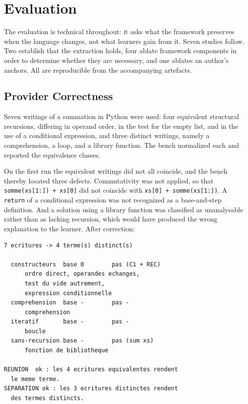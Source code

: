 \documentclass[10pt,twocolumn,letterpaper]{article}
\begin{document}
\section{Evaluation}
The evaluation is technical throughout: it asks what the framework
preserves when the language changes, not what learners gain from it.
Seven studies follow. Two establish that the extraction holds, four ablate
framework components in order to determine whether they are necessary, and
one ablates an author's anchors.
All are reproducible from the accompanying artefacts.

\subsection{Provider Correctness}
Seven writings of a summation in Python were used: four equivalent
structural recursions, differing in operand order, in the test for the
empty list, and in the use of a conditional expression, and three
distinct writings, namely a comprehension, a loop, and a library
function. The bench normalized each and reported the equivalence
classes.

On the first run the equivalent writings did not all coincide, and the
bench thereby located three defects. Commutativity was not applied, so that
\texttt{somme(xs[1:]) + xs[0]} did not coincide with
\texttt{xs[0] + somme(xs[1:])}. A \texttt{return} of a
conditional expression was not recognized as a base-and-step definition.
And a solution using a library function was classified as unanalysable
rather than as lacking recursion, which would have produced the wrong
explanation to the learner. After correction:
\begin{samepage}\noindent\begin{minipage}{\linewidth}
\begin{verbatim}
7 ecritures -> 4 terme(s) distinct(s)

  constructeurs  base 0        pas (C1 + REC)
      ordre direct, operandes echanges,
      test du vide autrement,
      expression conditionnelle
  comprehension  base -        pas -
      comprehension
  iteratif       base -        pas -
      boucle
  sans-recursion base -        pas (sum xs)
      fonction de bibliotheque

REUNION  ok : les 4 ecritures equivalentes rendent
  le meme terme.
SEPARATION ok : les 3 ecritures distinctes rendent
  des termes distincts.
\end{verbatim}
\end{minipage}\end{samepage}
\end{document}
